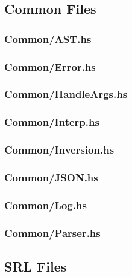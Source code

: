 \subsection{Common Files}
\label{app:Common_files}
\subsubsection{Common/AST.hs}
\label{app:Common_AST_hs}

\subsubsection{Common/Error.hs}
\label{app:Common_Error_hs}

\subsubsection{Common/HandleArgs.hs}
\label{app:Common_HandleArgs_hs}

\subsubsection{Common/Interp.hs}
\label{app:Common_Interp_hs}

\subsubsection{Common/Inversion.hs}
\label{app:Common_Inversion_hs}

\subsubsection{Common/JSON.hs}
\label{app:Common_JSON_hs}

\subsubsection{Common/Log.hs}
\label{app:Common_Log_hs}

\subsubsection{Common/Parser.hs}
\label{app:Common_Parser_hs}

\subsection{SRL Files}
\label{app:SRL_files}
